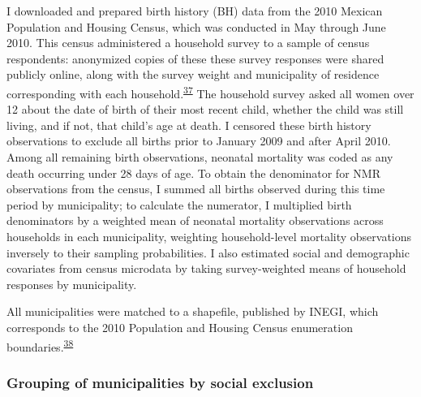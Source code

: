 \documentclass[
]{article}
\begin{document}
I downloaded and prepared birth history (BH) data from the 2010 Mexican Population and Housing Census, which was conducted in May through June 2010. This census administered a household survey to a sample of census respondents: anonymized copies of these these survey responses were shared publicly online, along with the survey weight and municipality of residence corresponding with each household.\textsuperscript{\protect\hyperlink{ref-INEGI2010a}{37}} The household survey asked all women over 12 about the date of birth of their most recent child, whether the child was still living, and if not, that child's age at death. I censored these birth history observations to exclude all births prior to January 2009 and after April 2010. Among all remaining birth observations, neonatal mortality was coded as any death occurring under 28 days of age. To obtain the denominator for NMR observations from the census, I summed all births observed during this time period by municipality; to calculate the numerator, I multiplied birth denominators by a weighted mean of neonatal mortality observations across households in each municipality, weighting household-level mortality observations inversely to their sampling probabilities. I also estimated social and demographic covariates from census microdata by taking survey-weighted means of household responses by municipality.

All municipalities were matched to a shapefile, published by INEGI, which corresponds to the 2010 Population and Housing Census enumeration boundaries.\textsuperscript{\protect\hyperlink{ref-INEGI2010b}{38}}

\hypertarget{grouping-of-municipalities-by-social-exclusion}{%
\subsubsection{Grouping of municipalities by social exclusion}\label{grouping-of-municipalities-by-social-exclusion}}
\end{document}
